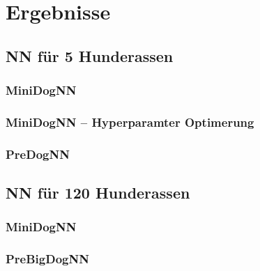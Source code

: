 \section{Ergebnisse}

\subsection{NN für 5 Hunderassen}

\subsubsection{MiniDogNN}

\subsubsection{MiniDogNN -- Hyperparamter Optimerung}

\subsubsection{PreDogNN}


\subsection{NN für 120 Hunderassen}

\subsubsection{MiniDogNN}

\subsubsection{PreBigDogNN}
